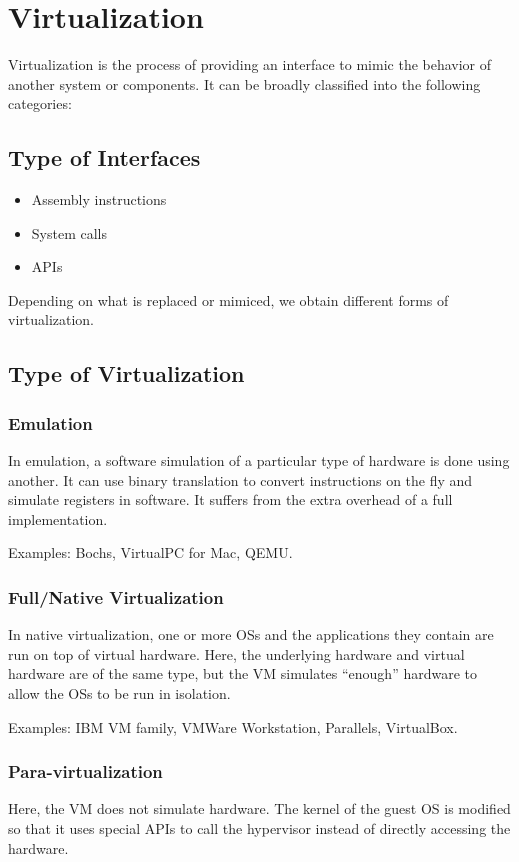 \documentclass[twoside]{article}
\begin{document}
\section{Virtualization}
Virtualization is the process of providing an interface to
mimic the behavior of another system or components. It can be broadly classified into the following categories:

\subsection{Type of Interfaces}
\begin{itemize}
\item Assembly instructions
\item System calls
\item APIs
\end{itemize}
Depending on what is replaced or mimiced, we obtain different forms of virtualization.

\subsection{Type of Virtualization}

\subsubsection{Emulation}
In emulation, a software simulation of a particular type of hardware is done using another. It can use binary translation to convert instructions on the fly and simulate registers in software. It suffers from the extra overhead of a full implementation.

Examples: Bochs, VirtualPC for Mac, QEMU.

\subsubsection{Full/Native Virtualization}
In native virtualization, one or more OSs and the applications they contain are run on top of virtual hardware. Here, the underlying hardware and virtual hardware are of the same type, but the VM simulates “enough” hardware to allow the OSs to be run in isolation.

Examples: IBM VM family, VMWare Workstation, Parallels, VirtualBox.

\subsubsection{Para-virtualization}
Here, the VM does not simulate hardware. The kernel of the guest OS is modified so that it uses special APIs to call the hypervisor instead of directly accessing the hardware.
\end{document}
